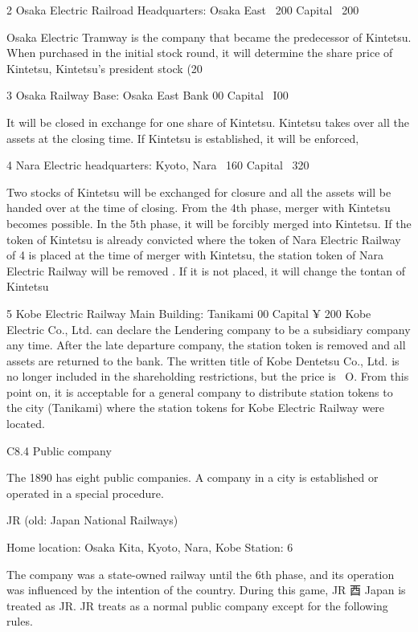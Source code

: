 \documentclass{article}
\begin{document}
\begin{CJK}{UTF8}{min}
2 Osaka Electric Railroad Headquarters: Osaka East \ 200 Capital \ 200

Osaka Electric Tramway is the company that became the predecessor of Kintetsu. When purchased in the initial stock round, it will determine the share price of Kintetsu, Kintetsu's president stock (20%

3 Osaka Railway Base: Osaka East Bank 00 Capital \ I00

It will be closed in exchange for one share of Kintetsu. Kintetsu takes over all the assets at the closing time. If Kintetsu is established, it will be enforced,

4 Nara Electric headquarters: Kyoto, Nara \ 160 Capital \ 320

Two stocks of Kintetsu will be exchanged for closure and all the assets will be handed over at the time of closing. From the 4th phase, merger with Kintetsu becomes possible. In the 5th phase, it will be forcibly merged into Kintetsu. If the token of Kintetsu is already convicted where the token of Nara Electric Railway of 4 is placed at the time of merger with Kintetsu, the station token of Nara Electric Railway will be removed . If it is not placed, it will change the tontan of Kintetsu

5 Kobe Electric Railway Main Building: Tanikami 00 Capital ¥ 200
Kobe Electric Co., Ltd. can declare the Lendering company to be a subsidiary company any time. After the late departure company, the station token is removed and all assets are returned to the bank. The written title of Kobe Dentetsu Co., Ltd. is no longer included in the shareholding restrictions, but the price is \ O. From this point on, it is acceptable for a general company to distribute station tokens to the city (Tanikami) where the station tokens for Kobe Electric Railway were located.

C8.4 Public company

The 1890 has eight public companies. A company in a city is established or operated in a special procedure.

JR (old: Japan National Railways)

Home location: Osaka Kita, Kyoto, Nara, Kobe Station: 6

The company was a state-owned railway until the 6th phase, and its operation was influenced by the intention of the country. During this game, JR 酉 Japan is treated as JR. JR treats as a normal public company except for the following rules.


\end{CJK}
\end{document}

